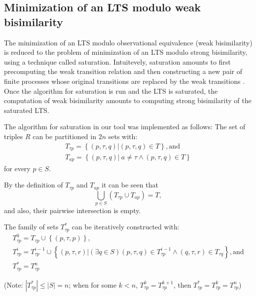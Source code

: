 \subsection{Minimization of an LTS modulo weak bisimilarity}
The minimization of an LTS modulo observational equivalence (weak bisimilarity) is reduced to the problem of minimization of an LTS modulo strong bisimilarity, using a technique called saturation. Intuitevely, saturation amounts to first precomputing the weak transition relation and then constructing a new pair of finite processes whose original transitions are replaced by the weak transitions \cite{ReactiveSystems}. Once the algorithm for saturation is run and the LTS is saturated, the computation of weak bisimilarity amounts to computing strong bisimilarity of the saturated LTS.

The algorithm for saturation in our tool was implemented as follows: The set of triples ${R}$ can be partitioned in ${2n}$ sets with: 
\begin{equation*}
	\begin{array}{lcl}
 		{T_{\tau p}=\left\{\left(p,\tau,q\right)| \left(p,\tau,q\right)\in T\right\}}, \text{and}\\
    {T_{ap}=\left\{\left(p,\tau,q\right)|\ a\neq\tau\wedge\left(p,\tau,q\right)\in T\right\}}
  \end{array}
\end{equation*} 
for every ${p\in S}$.

By the definition of ${T_{\tau p}}$ and ${T_{ap}}$ it can be seen that
\begin{equation*}
 {\bigcup_{p\in S}\left(T_{\tau p}\cup T_{ap}\right)=T},
\end{equation*} 
and also, their pairwise intersection is empty. 

The family of sets ${T^{*}_{\tau p}}$ can be iteratively constructed with:
\begin{equation*}
	\begin{array}{lcl}
		{T^{0}_{\tau p}=T_{\tau p}\cup\left\{\left(p,\tau,p\right)\right\}},\\
		{T^{i}_{\tau p}=T^{i-1}_{\tau p}\cup\left\{\left(p,\tau,r\right)|\left(\exists q\in S\right)\left(p,\tau,q\right)\in T^{i-1}_{\tau p}\wedge\left(q,\tau,r\right)\in T_{\tau q}\right\}}, \text{and} \\
		{T^{*}_{\tau p}=T^{n}_{\tau p}}
	\end{array}
\end{equation*}

(Note: ${\left|T^{*}_{\tau p}\right|\leq\left|S\right|=n}$; when for some ${k<n}$, ${T^{k}_{\tau p}=T^{k+1}_{\tau p}}$, then ${T^{*}_{\tau p}=T^{k}_{\tau p}=T^{n}_{\tau p}}$)

